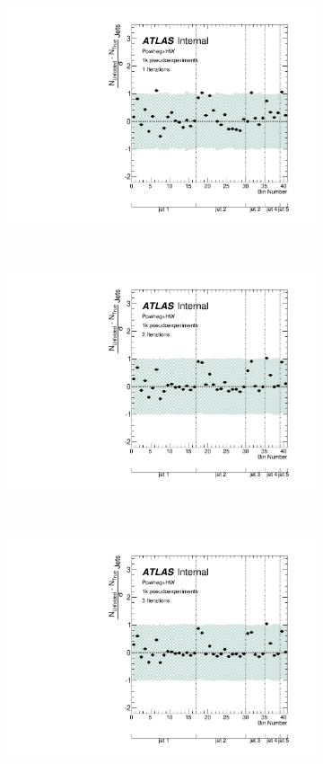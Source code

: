 \begin{figure}
\begin{subfigure}[]{0.5\textwidth}
\includegraphics[width=\textwidth]{fig/Stress/105860atlfast/Pull1Iterations.pdf}
\end{subfigure}
~
\begin{subfigure}[]{0.5\textwidth}
\includegraphics[width=\textwidth]{fig/Stress/105860atlfast/Pull2Iterations.pdf}
\end{subfigure}
\\
\begin{subfigure}[]{0.5\textwidth}
\includegraphics[width=\textwidth]{fig/Stress/105860atlfast/Pull3Iterations.pdf}

\end{subfigure}
\end{figure}
